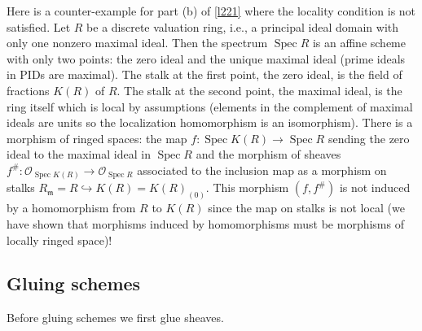 \documentclass[12pt,letter]{article}
\newcommand{\Spec}[0]{\operatorname{Spec}}
\begin{document}
	Here is a counter-example for part (b) of \autoref{l221} where the locality condition is not satisfied. Let $R$ be a discrete valuation ring, i.e., a principal ideal domain with only one nonzero maximal ideal. Then the spectrum $\Spec R$ is an affine scheme with only two points: the zero ideal and the unique maximal ideal (prime ideals in PIDs are maximal). The stalk at the first point, the zero ideal, is the field of fractions $K(R)$ of $R$. The stalk at the second point, the maximal ideal, is the ring itself which is local by assumptions (elements in the complement of maximal ideals are units so the localization homomorphism is an isomorphism). There is a morphism of ringed spaces: the map $f:\Spec K(R)\to \Spec R$ sending the zero ideal to the maximal ideal in $\Spec R$ and the morphism of sheaves $f^\#: \mathscr O_{\Spec K(R)}\to\mathscr O_{\Spec R}$ associated to the inclusion map as a morphism on stalks $R_{\mathfrak m}=R\hookrightarrow K(R)=K(R)_{(0)}$. This morphism $(f, f^\#)$ is not induced by a homomorphism from $R$ to $K(R)$ since the map on stalks is not local (we have shown that morphisms induced by homomorphisms must be morphisms of locally ringed space)!
	\subsection{Gluing schemes}\label{ssec-gluing}
	Before gluing schemes we first glue sheaves.
	
\end{document}
